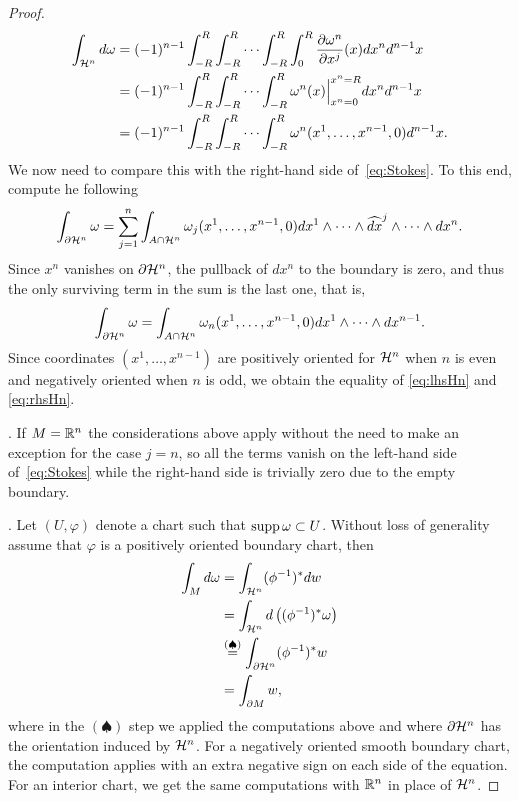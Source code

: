 \begin{proof}
\begin{align}
		\int_{\cH^n} d\omega
		 & =(-1)^{n-1} \int_{-R}^R\int_{-R}^R\cdots\int_{-R}^R\int_{0}^{R}\frac{\partial \omega^n}{\partial x^j}(x) dx^n d^{n-1} x \\ %
		 & =(-1)^{n-1} \int_{-R}^R\int_{-R}^R\cdots\int_{-R}^R \omega^n(x)\Big|_{x^n=0}^{x^n=R} dx^n d^{n-1} x                     \\ %
		 & =(-1)^{n-1} \int_{-R}^R\int_{-R}^R\cdots\int_{-R}^R \omega^n(x^1, \ldots, x^{n-1}, 0) d^{n-1} x                         %
		.\label{eq:lhsHn}
	\end{align}
	We now need to compare this with the right-hand side of~\eqref{eq:Stokes}.
	To this end, compute he following
	\begin{equation}
		\int_{\partial \mathcal{H}^n}\omega = \sum_{j=1}^n \int_{A\cap\mathcal{H}^n} \omega_j(x^1, \ldots, x^{n-1}, 0) dx^1 \wedge \cdots\wedge \widehat{dx}^j \wedge \cdots\wedge dx^n.
	\end{equation}
	Since $x^n$ vanishes on $\partial\mathcal{H}^n$, the pullback of $dx^n$ to the boundary is zero, and thus the only surviving term in the sum is the last one, that is,
	\begin{equation}\label{eq:rhsHn}
		\int_{\partial \mathcal{H}^n}\omega = \int_{A\cap\mathcal{H}^n} \omega_n(x^1, \ldots, x^{n-1}, 0) dx^1 \wedge\cdots\wedge dx^{n-1}.
	\end{equation}
	Since coordinates $(x^1, \ldots, x^{n-1})$ are positively oriented for $\mathcal{H}^n$ when $n$ is even and negatively oriented when $n$ is odd, we obtain the equality of \eqref{eq:lhsHn} and \eqref{eq:rhsHn}.

	.
	If $M=\mathbb{R}^n$ the considerations above apply without the need to make an exception for the case $j=n$, so all the terms vanish on the left-hand side of~\eqref{eq:Stokes} while the right-hand side is trivially zero due to the empty boundary.

	.
	Let $(U,\varphi)$ denote a chart such that $\operatorname{supp} \omega \subset U$.
	Without loss of generality assume that $\varphi$ is a positively oriented boundary chart, then
	\begin{align}
		\int_M d\omega
		 & = \int_{\mathcal{H}^n}(\phi^{-1})^* dw                                 \\
		 & = \int_{\mathcal{H}^n} d\left((\phi^{-1})^* \omega\right)              \\
		 & \overset{(\spadesuit)}{=} \int_{\partial \mathcal{H}^n}(\phi^{-1})^* w \\
		 & = \int_{\partial M} w ,
	\end{align}
	where in the $(\spadesuit)$ step we applied the computations above and where $\partial \mathcal{H}^n$ has the orientation induced by $\mathcal{H}^n$.
	For a negatively oriented smooth boundary chart, the computation applies with an extra negative sign on each side of the equation.
	For an interior chart, we get the same computations with $\mathbb{R}^n$ in place of $\mathcal{H}^n$.


\end{proof}
